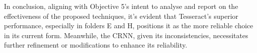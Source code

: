 In conclusion, aligning with Objective 5's intent to analyse and report on the effectiveness of the proposed techniques, it's evident that Tesseract's superior performance, especially in folders E and H, positions it as the more reliable choice in its current form. Meanwhile, the CRNN, given its inconsistencies, necessitates further refinement or modifications to enhance its reliability.


